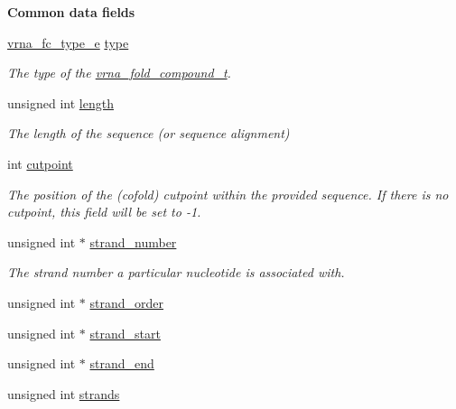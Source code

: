 \begin{Indent}\textbf{ Common data fields}\par
\begin{DoxyCompactItemize}
\item 
\mbox{\hyperlink{group__fold__compound_ga01a4ff86fa71deaaa5d1abbd95a1447d}{vrna\+\_\+fc\+\_\+type\+\_\+e}} \mbox{\hyperlink{group__fold__compound_ac5eab693deac9a1a40c2a95ac294707c}{type}}
\begin{DoxyCompactList}\small\item\em The type of the \mbox{\hyperlink{group__fold__compound_ga1b0cef17fd40466cef5968eaeeff6166}{vrna\+\_\+fold\+\_\+compound\+\_\+t}}. \end{DoxyCompactList}\item 
unsigned int \mbox{\hyperlink{group__fold__compound_a95fbfed770b858e50c766505dc4bf998}{length}}
\begin{DoxyCompactList}\small\item\em The length of the sequence (or sequence alignment) \end{DoxyCompactList}\item 
int \mbox{\hyperlink{group__fold__compound_ae1a7bbff0256577e2b22709bac11fdb4}{cutpoint}}
\begin{DoxyCompactList}\small\item\em The position of the (cofold) cutpoint within the provided sequence. If there is no cutpoint, this field will be set to -\/1. \end{DoxyCompactList}\item 
unsigned int $\ast$ \mbox{\hyperlink{group__fold__compound_a23304c5186dfae97bc69dc19d37f70c3}{strand\+\_\+number}}
\begin{DoxyCompactList}\small\item\em The strand number a particular nucleotide is associated with. \end{DoxyCompactList}\item 
unsigned int $\ast$ \mbox{\hyperlink{group__fold__compound_a3bf15e0e44539f9f622fd09227bf3de1}{strand\+\_\+order}}
\item 
unsigned int $\ast$ \mbox{\hyperlink{group__fold__compound_a571ee9a932f633c7d9167ae029573935}{strand\+\_\+start}}
\item 
unsigned int $\ast$ \mbox{\hyperlink{group__fold__compound_aaa1b51bc6eb47cc661fea834d7175a54}{strand\+\_\+end}}
\item 
unsigned int \mbox{\hyperlink{group__fold__compound_ad8962b97f5e5e233d9bfb5b16a691d26}{strands}}
\item 

\end{DoxyCompactItemize}
\end{Indent}
